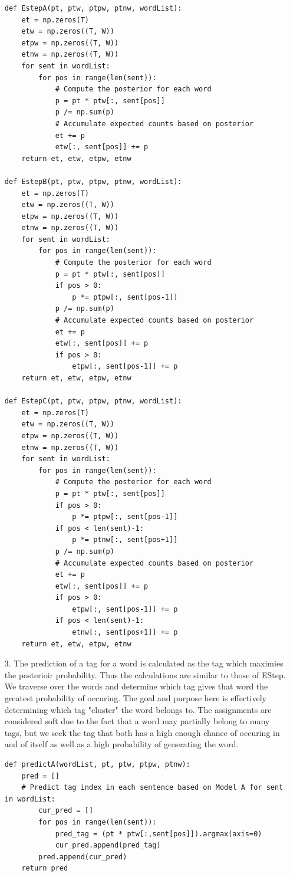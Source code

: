 \documentclass{article}
\begin{document}
\begin{enumerate}
\newpage

\begin{lstlisting}   
def EstepA(pt, ptw, ptpw, ptnw, wordList):
	et = np.zeros(T)
	etw = np.zeros((T, W))
	etpw = np.zeros((T, W))
	etnw = np.zeros((T, W))
	for sent in wordList:
		for pos in range(len(sent)):
			# Compute the posterior for each word
			p = pt * ptw[:, sent[pos]]
			p /= np.sum(p)
			# Accumulate expected counts based on posterior
			et += p
			etw[:, sent[pos]] += p
	return et, etw, etpw, etnw
			
def EstepB(pt, ptw, ptpw, ptnw, wordList):
	et = np.zeros(T)
	etw = np.zeros((T, W))
	etpw = np.zeros((T, W))
	etnw = np.zeros((T, W))
	for sent in wordList:
		for pos in range(len(sent)):
			# Compute the posterior for each word
			p = pt * ptw[:, sent[pos]]
			if pos > 0:
				p *= ptpw[:, sent[pos-1]]
			p /= np.sum(p)
			# Accumulate expected counts based on posterior
			et += p
			etw[:, sent[pos]] += p
			if pos > 0:
				etpw[:, sent[pos-1]] += p
	return et, etw, etpw, etnw
	
def EstepC(pt, ptw, ptpw, ptnw, wordList):
	et = np.zeros(T)
	etw = np.zeros((T, W))
	etpw = np.zeros((T, W))
	etnw = np.zeros((T, W))
	for sent in wordList:
		for pos in range(len(sent)):
			# Compute the posterior for each word
			p = pt * ptw[:, sent[pos]]
			if pos > 0:
				p *= ptpw[:, sent[pos-1]]
			if pos < len(sent)-1:
				p *= ptnw[:, sent[pos+1]]
			p /= np.sum(p)
			# Accumulate expected counts based on posterior
			et += p
			etw[:, sent[pos]] += p
			if pos > 0:
				etpw[:, sent[pos-1]] += p
			if pos < len(sent)-1:
				etnw[:, sent[pos+1]] += p
	return et, etw, etpw, etnw
\end{lstlisting}

\newpage

\item[3.]
	The prediction of a tag for a word is calculated as the tag which maximies the posterioir probability. Thus the calculations are similar to those of EStep. We traverse over the words and determine which tag gives that word the greatest probability of occuring. The goal and purpose here is effectively determining which tag "cluster" the word belongs to. The assignments are considered soft due to the fact that a word may partially belong to many tags, but we seek the tag that both has a high enough chance of occuring in and of itself as well as a high probability of generating the word. \\

\begin{lstlisting}   
def predictA(wordList, pt, ptw, ptpw, ptnw):
	pred = []
	# Predict tag index in each sentence based on Model A for sent in wordList:
		cur_pred = []
		for pos in range(len(sent)):
			pred_tag = (pt * ptw[:,sent[pos]]).argmax(axis=0)
			cur_pred.append(pred_tag)
		pred.append(cur_pred)
	return pred
			

\end{lstlisting}
\end{enumerate}
\end{document}
